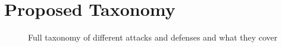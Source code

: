 \section{Proposed Taxonomy}

\begin{center}
\begin{figure}[!p]
    \caption{Full taxonomy of different attacks and defenses and what they cover}
    \label{fig:categorization}
\end{figure}
\afterpage{\clearpage}
\end{center}
